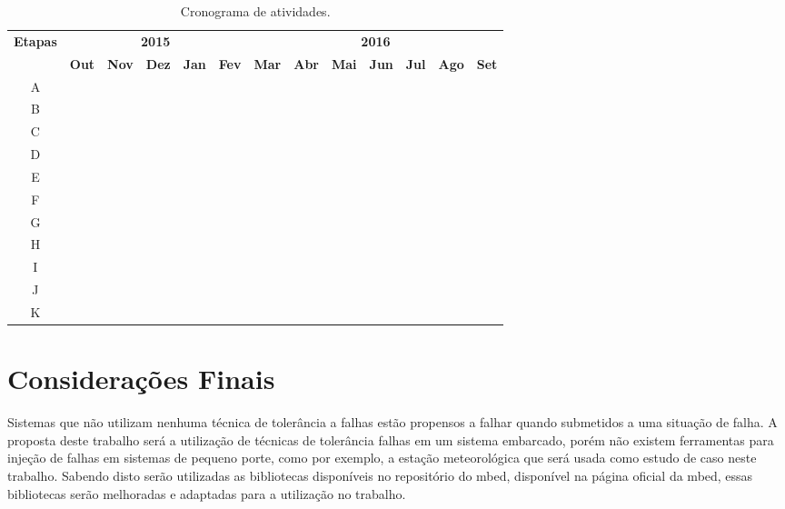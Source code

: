 \documentclass[a4paper,12pt,brazil]{ufms-cpcx}
\begin{document}
\begin{table}[!h]
	\renewcommand{\arraystretch}{1.3}
	\centering
	\begin{tabular}{|c|ccccc|ccccccc|}
		\hline
		\multirow{2}{*}{\textbf{Etapas}} & \multicolumn{5}{c|}{\textbf{2015}} & \multicolumn{7}{c|}{\textbf{2016}} \\
		& \textbf{Out} & \textbf{Nov} & \textbf{Dez} & \textbf{Jan} & \textbf{Fev} & \textbf{Mar} & \textbf{Abr} & \textbf{Mai} & \textbf{Jun} & \textbf{Jul} & \textbf{Ago} & \textbf{Set} \\
		\hline
		A & \checkmark & \checkmark & & & & & & & & & & \\
		\hline
		B & \checkmark & \checkmark & & & & & & & & & & \\
		\hline
		C & & & \checkmark & \checkmark & & & & & & & & \\
		\hline
		D & & & \checkmark & \checkmark & \checkmark & & & & & & & \\
		\hline
		E & & & & & \checkmark & \checkmark & & & & & & \\
		\hline
		F & & & & & & \checkmark & \checkmark & & & & & \\
		\hline
		G & & & & & & & \checkmark & \checkmark & \checkmark & \checkmark & & \\
		\hline
		H & & & & & & & & \checkmark & \checkmark & \checkmark & & \\
		\hline
		I & & & & & & & & & \checkmark & & & \\
		\hline
		J & & & & & & & & & & \checkmark & \checkmark & \\
		\hline
		K & & & & & & & & & & \checkmark & \checkmark & \checkmark \\
		\hline
	
	\end{tabular}
	\caption[Cronograma de atividades]{Cronograma de atividades.}
	\label{Tab:cronograma}
\end{table}

\chapter{Considerações Finais}

Sistemas que não utilizam nenhuma técnica de tolerância a falhas estão propensos a falhar quando submetidos a uma situação de falha. A proposta deste trabalho será a utilização de técnicas de tolerância falhas em um sistema embarcado, porém não existem ferramentas para injeção de falhas em sistemas de pequeno porte, como por exemplo, a estação meteorológica que será usada como estudo de caso neste trabalho. Sabendo disto serão utilizadas as bibliotecas disponíveis no repositório do mbed, disponível na página oficial da mbed, essas bibliotecas serão melhoradas e adaptadas para a utilização no trabalho.
\end{document}
